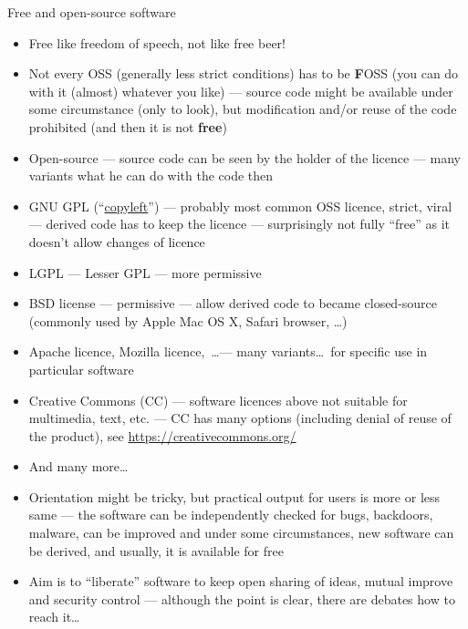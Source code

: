 \documentclass[hyperref={bookmarks=true, unicode=true, colorlinks=true, pdftitle={Linux, command line and MetaCentrum}, plainpages=false, pdfauthor={Vojtech Zeisek}, pdfsubject={Course about use of Linux command line, writing shell scripts and using MetaCentrum of CESNET}, pdfcreator={XeLaTeX, http://www.xelatex.org/}, pdfkeywords={Linux, GNU, BASH, shell, command line, MetaCentrum}, linkcolor=Sienna, anchorcolor=black, citecolor=green, filecolor=magenta, menucolor=Sienna, urlcolor=cyan, pdftex}, compress, ucs, xelatex, xcolor=svgnames, 11pt]{beamer}
\begin{document}
\begin{frame}[allowframebreaks]{Free and open-source software}
\begin{itemize}
  \item Free like freedom of speech, \alert{not} like free beer!
  \item Not every OSS (generally less strict conditions) has to be \textbf{F}OSS (you can do with it (almost) whatever you like) --- source code might be available under some circumstance (only to look), but modification and/or reuse of the code prohibited (and then it is not \textbf{free})
  \item Open-source --- source code can be seen by the holder of the licence --- many variants what he can do with the code then
  \item GNU GPL (``\href{https://www.gnu.org/copyleft/}{copyleft}'') --- probably most common OSS licence, strict, viral --- derived code has to keep the licence --- surprisingly not fully ``free'' as it doesn't allow changes of licence
  \item LGPL --- Lesser GPL --- more permissive
  \item BSD license --- permissive --- allow derived code to became closed-source (commonly used by Apple Mac OS X, Safari browser, \ldots)
  \item Apache licence, Mozilla licence,~\ldots --- many variants\ldots~for specific use in particular software
  \item Creative Commons (CC) --- software licences above not suitable for multimedia, text, etc. --- CC has many options (including denial of reuse of the product), see \href{https://creativecommons.org/}{https://creativecommons.org/}
  \item And many more\ldots
  \item Orientation might be tricky, but practical output for users is more or less same --- the software can be independently checked for bugs, backdoors, malware, can be improved and under some circumstances, new software can be derived, and usually, it is available for free
  \item Aim is to ``liberate'' software to keep open sharing of ideas, mutual improve and security control --- although the point is clear, there are debates how to reach it\ldots
\end{itemize}
\end{frame}
\end{document}
